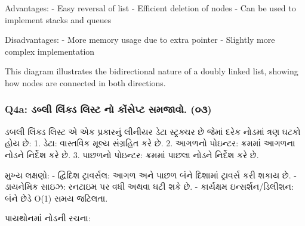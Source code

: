 Advantages: - Easy reversal of list - Efficient deletion of nodes - Can
be used to implement stacks and queues

Disadvantages: - More memory usage due to extra pointer - Slightly more
complex implementation

\begin{Shaded}
\begin{Highlighting}[]
\end{Highlighting}
\end{Shaded}

This diagram illustrates the bidirectional nature of a doubly linked
list, showing how nodes are connected in both directions.

\hypertarget{q4a-uxaa1uxaacuxab2-uxab2uxa95uxaa1-uxab2uxab8uxa9f-uxaa8-uxa95uxab8uxaaauxa9f-uxab8uxaaeuxa9cuxab5.-uxae6uxae9}{%
\subsubsection{Q4a: ડબ્લી લિંક્ડ લિસ્ટ નો કોંસેપ્ટ સમજાવો.
(૦૩)}\label{q4a-uxaa1uxaacuxab2-uxab2uxa95uxaa1-uxab2uxab8uxa9f-uxaa8-uxa95uxab8uxaaauxa9f-uxab8uxaaeuxa9cuxab5.-uxae6uxae9}}

ડબલી લિંક્ડ લિસ્ટ એ એક પ્રકારનું લીનીયર ડેટા સ્ટ્રક્ચર છે જેમાં દરેક નોડમાં ત્રણ ઘટકો
હોય છે: 1. ડેટા: વાસ્તવિક મૂલ્ય સંગ્રહિત કરે છે. 2. આગળનો પોઇન્ટર: ક્રમમાં આગળના
નોડને નિર્દેશ કરે છે. 3. પાછળનો પોઇન્ટર: ક્રમમાં પાછલા નોડને નિર્દેશ કરે છે.

મુખ્ય લક્ષણો: - દ્વિદિશ ટ્રાવર્સલ: આગળ અને પાછળ બંને દિશામાં ટ્રાવર્સ કરી શકાય છે. -
ડાયનેમિક સાઇઝ: રનટાઇમ પર વધી અથવા ઘટી શકે છે. - કાર્યક્ષમ ઇન્સર્શન/ડિલીશન: બંને
છેડે O(1) સમય જટિલતા.

પાયથોનમાં નોડની રચના:

\begin{Shaded}
\begin{Highlighting}[]
     \NormalTok{(}
        \OperatorTok{=}
         \OperatorTok{=} 
        \OperatorTok{=} 
\end{Highlighting}
\end{Shaded}

